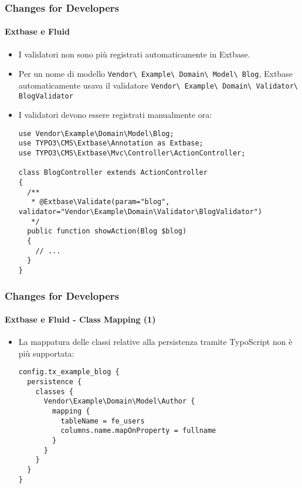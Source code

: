 \begin{frame}[fragile]
	\frametitle{Changes for Developers}
	\framesubtitle{Extbase e Fluid}

	\lstset{basicstyle=\tiny\ttfamily}

	\begin{itemize}
		\item I validatori non sono più registrati automaticamente in Extbase.
		\item Per un nome di modello
			\small\texttt{Vendor\textbackslash
				Example\textbackslash
				Domain\textbackslash
				Model\textbackslash
				Blog}\normalsize,\newline
			Extbase automaticamente usava il validatore
			\small\texttt{Vendor\textbackslash
				Example\textbackslash
				Domain\textbackslash
				Validator\textbackslash
				BlogValidator}\normalsize

		\item I validatori devono essere registrati manualmente ora:

\begin{lstlisting}
use Vendor\Example\Domain\Model\Blog;
use TYPO3\CMS\Extbase\Annotation as Extbase;
use TYPO3\CMS\Extbase\Mvc\Controller\ActionController;

class BlogController extends ActionController
{
  /**
   * @Extbase\Validate(param="blog", validator="Vendor\Example\Domain\Validator\BlogValidator")
   */
  public function showAction(Blog $blog)
  {
    // ...
  }
}
\end{lstlisting}

	\end{itemize}

\end{frame}


\begin{frame}[fragile]
	\frametitle{Changes for Developers}
	\framesubtitle{Extbase e Fluid - Class Mapping (1)}

	\lstset{basicstyle=\tiny\ttfamily}

	\begin{itemize}
		\item La mappatura delle classi relative alla persistenza tramite TypoScript non è più supportata:

\begin{lstlisting}
config.tx_example_blog {
  persistence {
    classes {
      Vendor\Example\Domain\Model\Author {
        mapping {
          tableName = fe_users
          columns.name.mapOnProperty = fullname
        }
      }
    }
  }
}
\end{lstlisting}

	\end{itemize}

\end{frame}

